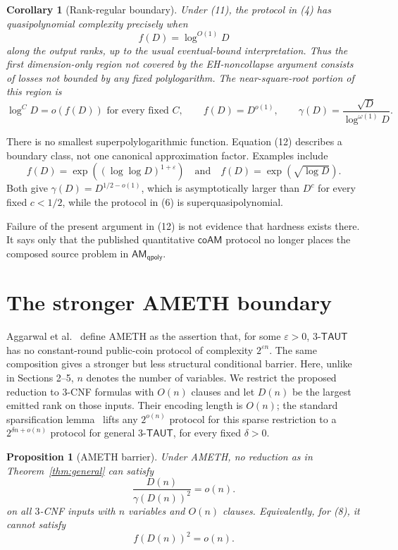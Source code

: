 \documentclass[11pt]{article}
\newtheorem{corollary}[theorem]{Corollary}
\newtheorem{proposition}[theorem]{Proposition}
\newcommand{\coAM}{\mathsf{coAM}}
\newcommand{\AM}{\mathsf{AM}}
\newcommand{\qpoly}{\mathsf{qpoly}}
\newcommand{\TAUT}{\mathsf{TAUT}}
\begin{document}
\begin{corollary}[Rank-regular boundary]
Under (11), the protocol in (4) has quasipolynomial complexity precisely when
\[
  f(D)=\log^{O(1)}D
\]
along the output ranks, up to the usual eventual-bound interpretation.
Thus the first dimension-only region not covered by the EH-noncollapse
argument consists of losses not bounded by any fixed polylogarithm.  The
near-square-root portion of this region is
\[
  \log^C D=o(f(D))\text{ for every fixed }C,
  \qquad f(D)=D^{o(1)},
  \qquad
  \gamma(D)=\frac{\sqrt D}{\log^{\omega(1)}D}.           \tag{12}
\]
\end{corollary}

There is no smallest superpolylogarithmic function.  Equation (12) describes
a boundary class, not one canonical approximation factor.  Examples include
\[
  f(D)=\exp((\log\log D)^{1+\varepsilon})
  \quad\text{and}\quad
  f(D)=\exp(\sqrt{\log D}).
\]
Both give $\gamma(D)=D^{1/2-o(1)}$, which is asymptotically larger than
$D^c$ for every fixed $c<1/2$, while the protocol in (6) is
superquasipolynomial.

Failure of the present argument in (12) is not evidence that hardness exists
there.  It says only that the published quantitative $\coAM$ protocol no
longer places the composed source problem in $\AM_{\qpoly}$.

\section{The stronger AMETH boundary}

Aggarwal et al.~\cite{ABBGKLPV22} define AMETH as the assertion that, for
some $\varepsilon>0$, $3$-$\TAUT$ has no constant-round public-coin protocol of complexity
$2^{\varepsilon n}$.  The same composition gives a stronger but less
structural conditional barrier.  Here, unlike in Sections 2--5, $n$ denotes
the number of variables.  We restrict the proposed reduction to $3$-CNF
formulas with $O(n)$ clauses and let $D(n)$ be the largest emitted rank on
those inputs.  Their encoding length is $O(n)$; the standard sparsification
lemma~\cite{IPZ01} lifts any $2^{o(n)}$ protocol for this sparse restriction to a
$2^{\delta n+o(n)}$ protocol for general $3$-$\TAUT$, for every fixed
$\delta>0$.

\begin{proposition}[AMETH barrier]                                \label{prop:ameth}
Under AMETH, no reduction as in Theorem~\ref{thm:general} can satisfy
\[
  \frac{D(n)}{\gamma(D(n))^2}=o(n).                       \tag{13}
\]
on all $3$-CNF inputs with $n$ variables and $O(n)$ clauses.
Equivalently, for (8), it cannot satisfy
\[
  f(D(n))^2=o(n).                                         \tag{14}
\]
\end{proposition}
\end{document}
